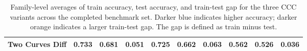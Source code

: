 \begin{table}[htbp]
{\begin{tabular}{l|ccc|ccc|ccc}
Two Curves Diff      & \cellcolor{blue!52}0.733 & \cellcolor{blue!37}0.681 & \cellcolor{orange!17}0.051 & \cellcolor{blue!49}0.725 & \cellcolor{blue!32}0.662 & \cellcolor{orange!22}0.063 & \cellcolor{blue!18}0.562 & \cellcolor{blue!14}0.526 & \cellcolor{orange!12}0.036 \\
\hline
\end{tabular}
}
\caption{Family-level averages of train accuracy, test accuracy, and train-test gap for the three CCC variants across the completed benchmark set. Darker blue indicates higher accuracy; darker orange indicates a larger train-test gap. The gap is defined as train minus test.}
\label{tab:ccc-train-test-gaps}
\end{table}
